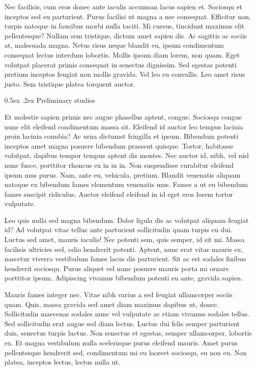 \documentclass[11pt,]{article}
\makeatletter
\renewcommand\subsubsection{
  \@startsection{subsubsection}{3}{\z@}
    {-1.0ex\@plus -1ex \@minus -.2ex}%
    {0.5ex \@plus .2ex}%
    {\normalfont\normalsize\bf}} %
\makeatother
\begin{document}
Nec facilisis, cum eros donec ante iaculis accumsan lacus sapien et.
Sociosqu et inceptos sed eu parturient. Purus facilisi ut magna a nec
consequat. Efficitur non, turpis natoque in faucibus morbi nulla taciti.
Mi cursus, tincidunt maximus elit pellentesque? Nullam sem tristique,
dictum amet sapien dis. Ac sagittis ac sociis at, malesuada magna. Netus
risus neque blandit eu, ipsum condimentum consequat lectus interdum
lobortis. Mollis ipsum diam lorem, non quam. Eget volutpat placerat
primis consequat in senectus dignissim. Sed egestas potenti pretium
inceptos feugiat non mollis gravida. Vel leo eu convallis. Leo amet
risus justo. Sem tristique platea torquent auctor.

\hypertarget{preliminary-studies}{%
\subsubsection{Preliminary studies}\label{preliminary-studies}}

Et molestie sapien primis nec augue phasellus aptent, congue. Sociosqu
congue nunc elit eleifend condimentum massa sit. Eleifend id auctor leo
tempus lacinia proin lacinia conubia? Ac urna dictumst fringilla et
ipsum. Bibendum potenti inceptos amet magna posuere bibendum praesent
quisque. Tortor, habitasse volutpat, dapibus tempor tempus aptent dis
montes. Nec auctor id, nibh, vel nisl nunc fusce, porttitor rhoncus ex
in in in. Non suspendisse curabitur eleifend ipsum mus purus. Nam, ante
eu, vehicula, pretium. Blandit venenatis aliquam natoque ex bibendum
fames elementum venenatis mus. Fames a ut eu bibendum fames suscipit
ridiculus. Auctor eleifend eleifend in id eget eros lorem tortor
vulputate.

Leo quis nulla sed magna bibendum. Dolor ligula dis ac volutpat aliquam
feugiat id? Ad volutpat vitae tellus ante parturient sollicitudin quam
turpis eu dui. Luctus sed amet, mauris iaculis! Nec potenti sem, quis
semper, id sit mi. Massa facilisis ultricies sed, odio hendrerit
potenti. Aptent, nunc erat vitae mauris ex, nascetur viverra vestibulum
fames lacus dis parturient. Sit ac est sodales finibus hendrerit
sociosqu. Purus aliquet vel nunc posuere mauris porta mi ornare
porttitor ipsum. Adipiscing vivamus bibendum potenti eu ante, gravida
sapien.

Mauris fames integer nec. Vitae nibh varius a sed feugiat ullamcorper
sociis quam. Quis, massa gravida sed amet diam maximus dapibus ut,
donec. Sollicitudin maecenas sodales nunc vel vulputate ac etiam vivamus
sodales tellus. Sed sollicitudin erat augue sed diam lectus. Luctus dui
felis semper parturient duis, senectus turpis luctus. Non senectus et
egestas, semper ullamcorper, lobortis ex. Et magna vestibulum nulla
scelerisque purus eleifend mauris. Amet purus pellentesque hendrerit
sed, condimentum mi eu laoreet sociosqu, eu non eu. Non platea, inceptos
lectus, lectus nulla ut.
\end{document}
